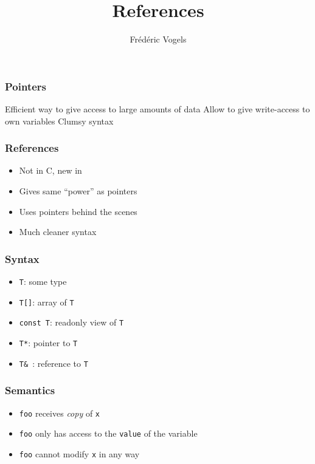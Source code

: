\documentclass{../ucll-slides}
\title{References}
\author{Fr\'ed\'eric Vogels}
\begin{document}
\begin{frame}
  \titlepage
\end{frame}

\begin{frame}
  \frametitle{Pointers}
  \begin{procontralist}
    \pro Efficient way to give access to large amounts of data
    \pro Allow to give write-access to own variables
    \con Clumsy syntax
  \end{procontralist}
  \vskip5mm
\end{frame}

\begin{frame}
  \frametitle{References}
  \begin{itemize}
    \item Not in C, new in \cpp
    \item Gives same ``power'' as pointers
    \item Uses pointers behind the scenes
    \item Much cleaner syntax
  \end{itemize}
\end{frame}

\begin{frame}
  \frametitle{Syntax}
  \begin{itemize}
    \item {\tt T}: some type
    \item {\tt T[]}: array of {\tt T}
    \item {\tt const T}: readonly view of {\tt T}
    \item {\tt T*}: pointer to {\tt T}
    \item<2-> {\tt T\& }: reference to {\tt T}
  \end{itemize}
\end{frame}

\begin{frame}
  \frametitle{Semantics}
  \begin{itemize}
    \item {\tt foo} receives \emph{copy} of {\tt x}
    \item {\tt foo} only has access to the {\tt value} of the variable
    \item {\tt foo} cannot modify {\tt x} in any way
  \end{itemize}
\end{frame}
\end{document}
